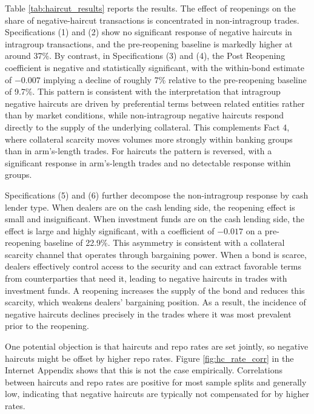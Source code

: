 \documentclass[english, 12pt, oneside]{article}
\begin{document}
Table \ref{tab:haircut_results} reports the results. The effect of reopenings on the share of negative-haircut transactions is concentrated in non-intragroup trades. Specifications (1) and (2) show no significant response of negative haircuts in intragroup transactions, and the pre-reopening baseline is markedly higher at around 37\%. By contrast, in Specifications (3) and (4), the Post Reopening coefficient is negative and statistically significant, with the within-bond estimate of $-0.007$ implying a decline of roughly 7\% relative to the pre-reopening baseline of 9.7\%. This pattern is consistent with the interpretation that intragroup negative haircuts are driven by preferential terms between related entities rather than by market conditions, while non-intragroup negative haircuts respond directly to the supply of the underlying collateral. This complements Fact 4, where collateral scarcity moves volumes more strongly within banking groups than in arm's-length trades. For haircuts the pattern is reversed, with a significant response in arm's-length trades and no detectable response within groups.

Specifications (5) and (6) further decompose the non-intragroup response by cash lender type. When dealers are on the cash lending side, the reopening effect is small and insignificant. When investment funds are on the cash lending side, the effect is large and highly significant, with a coefficient of $-0.017$ on a pre-reopening baseline of 22.9\%. This asymmetry is consistent with a collateral scarcity channel that operates through bargaining power. When a bond is scarce, dealers effectively control access to the security and can extract favorable terms from counterparties that need it, leading to negative haircuts in trades with investment funds. A reopening increases the supply of the bond and reduces this scarcity, which weakens dealers' bargaining position. As a result, the incidence of negative haircuts declines precisely in the trades where it was most prevalent prior to the reopening.


One potential objection is that haircuts and repo rates are set jointly, so negative haircuts might be offset by higher repo rates. Figure \ref{fig:hc_rate_corr} in the Internet Appendix shows that this is not the case empirically. Correlations between haircuts and repo rates are positive for most sample splits and generally low, indicating that negative haircuts are typically not compensated for by higher rates.
\end{document}
